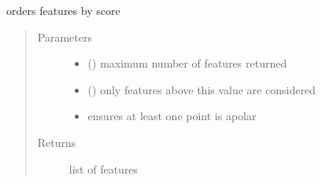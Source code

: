 \documentclass[letterpaper,10pt,english]{sphinxmanual}
\begin{document}
\begin{fulllineitems}
\begin{fulllineitems}
\end{fulllineitems}


\begin{fulllineitems}
\label{\detokenize{hs_pharmacophore_api:hotspots.hs_pharmacophore.PharmacophoreModel.rank_features}}
orders features by score
\begin{quote}\begin{description}
\item[{Parameters}] \leavevmode\begin{itemize}
\item {} 
 () \textendash{} maximum number of features returned

\item {} 
 () \textendash{} only features above this value are considered

\item {} 
 \textendash{} ensures at least one point is apolar

\end{itemize}

\item[{Returns}] \leavevmode
list of features

\end{description}\end{quote}

\begin{sphinxVerbatim}[commandchars=\\\{\}]
   
\end{sphinxVerbatim}


\end{fulllineitems}
\end{fulllineitems}
\end{document}
